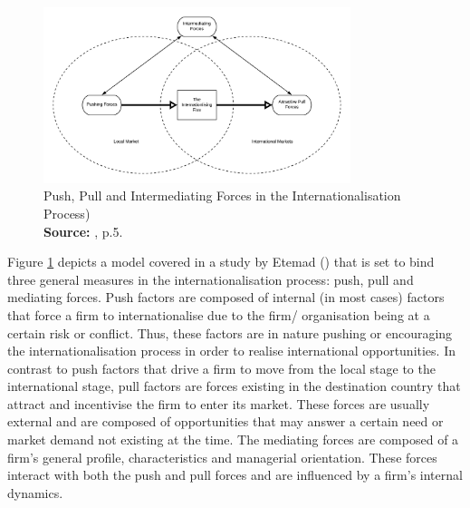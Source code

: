 \documentclass[12pt,a4paper]{article}
\newcommand*{\captionsource}[2]{%
  \caption[{#1}]{%
    #1%
    \\\hspace{\linewidth}%
    \textbf{Source:} #2%
  }%
}
\begin{document}

  \vspace{5mm}
\begin{figure}[H]
	\centering
  \includegraphics[width=0.8\textwidth, scale=0.1]{figures/fig_pull_push_forces}
  \vspace{5mm}
    \captionsetup{justification=centering,margin=2cm}
      \captionsource{Push, Pull and Intermediating Forces in the Internationalisation Process)}{\cite{etemadInternationalizationSmallMediumsized2004}, p.5.}
	\label{fig:pull_push_forces}
\end{figure}

Figure \ref{fig:pull_push_forces} depicts a model covered in a study by Etemad (\citeyear{etemadInternationalizationSmallMediumsized2004}) that is set to bind three general measures in the internationalisation process: push, pull and mediating forces. Push factors are composed of internal (in most cases) factors that force a firm to internationalise due to the firm/ organisation being at a certain risk or conflict. Thus, these factors are in nature pushing or encouraging the internationalisation process in order to realise international opportunities. In contrast to push factors that drive a firm to move from the local stage to the international stage, pull factors are forces existing in the destination country that attract and incentivise the firm to enter its market. These forces are usually external and are composed of opportunities that may answer a certain need or market demand not existing at the time. The mediating forces are composed of a firm's general profile, characteristics and managerial orientation. These forces interact with both the push and pull forces and are influenced by a firm's internal dynamics.
\end{document}
